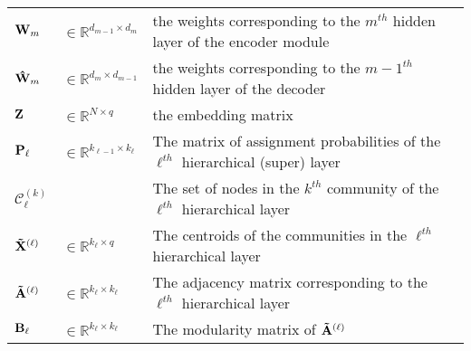 \documentclass[a4paper,12pt]{article}
\begin{document}
\begin{table}[!ht]
\begin{tabular}{p{2cm}|p{3cm}|p{10cm}}
		${\bf W}_{m}$ & $\in \mathbb{R}^{d_{m-1}\times d_{m}}$ & the weights corresponding to the ${m}^{th}$ hidden layer of the encoder module \\
		
		${\bf \hat{W}}_{m}$ & $\in \mathbb{R}^{d_{m}\times d_{m-1}}$ & the weights corresponding to the ${m-1}^{th}$ hidden layer of the decoder \\
		
		${\bf Z}$ & $\in\mathbb{R}^{N \times q}$ & the embedding matrix \\
		
		${\bf P}_\ell$ & $\in\mathbb{R}^{k_{\ell-1} \times k_\ell}$ & The matrix of assignment probabilities of the $\ell^{th}$ hierarchical (super) layer \\
		
		$\mathcal{C}_\ell^{(k)}$ &  & The set of nodes in the $k^{th}$ community of the $\ell^{th}$ hierarchical layer \\
		
		${\bf \tilde X}^{(\ell)}$ & $\in\mathbb{R}^{k_\ell \times q}$& The centroids of the communities in the $\ell^{th}$ hierarchical layer \\
		
		${\bf \tilde A}^{(\ell)}$ & $\in\mathbb{R}^{k_\ell \times k_\ell}$& The adjacency matrix corresponding to the $\ell^{th}$ hierarchical layer \\
		
		${\bf B}_\ell$ & $\in\mathbb{R}^{k_\ell \times k_\ell}$ & The modularity matrix of ${\bf \tilde A}^{(\ell)}$ \\
		
		\bottomrule[0.08cm]
	\end{tabular}
\end{table}

\newpage

	
	
	
	
	
	
	
	
	
	
	
	
	
	
	
	
	
	
	
	
	
	
	
	
	
	
	
	
	
	
	
	
	
	
	
	\clearpage
	\newpage
	
	
	
	
	
	
	
	
	
\end{document}
